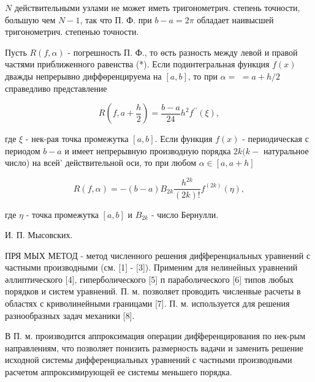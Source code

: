 \documentclass[10pt]{article}
\begin{document}
$N$ действительными узлами не может иметь тригонометрич. степень точности, большую чем $N-1$, так что П. Ф. при $b-a=2 \pi$ обладает наивысшей тригонометрич. степенью точности.



Пусть $R(f, \alpha)$ - погрешность П. Ф., то өсть разность между левой и правой частями приближенного равенства (*). Если подинтегральная функция $f(x)$ дважды непрерывно диффөренцируема на $[a, b]$, то при $\alpha=$ $=a+h / 2$ справедливо представление



\[

R\left(f, a+\frac{h}{2}\right)=\frac{b-a}{24} h^{2} f^{\prime \prime}(\xi),

\]



где $\xi$ - нек-рая точка промежутка $[a, b]$. Если функция $f(x)$ - периодическая с периодом $b-a$ и имеет непрерывную производную порядка $2 k(k-$ натуральное число) на всей' действительной оси, то при любом $\alpha \in[a, a+h]$



\[

R(f, \alpha)=-(b-a) B_{2 k} \frac{h^{2 k}}{(2 k) !} f^{(2 k)}(\eta),

\]



где $\eta$ - точка промежутка $[a, b]$ и $B_{2 k}$ - число Бернулли.



И. П. Мысовских.



ПРЯ МЫХ МЕТОД - метод численного решения диф̆ференциальных уравнений с частными производными (см. [1] - [3]). Применим для нелинейных уравнений әллиптического [4], гиперболического [5] п параболического [6] типов любых порядков и систем уравнений. П. м. позволяет проводить численвые расчеты в областях с криволинейными границами [7]. П. м. используется для решения разнообразных задач механики [8].



В П. м. производится аппроксимация операции диф̆ференцирования по нек-рым направлениям, что позволяет понизить размерность вадачи и заменить решение исходной системы дифференциальных уравнений с частными производными расчетом аппроксимирующей ее системы меньшего порядка.
\end{document}
